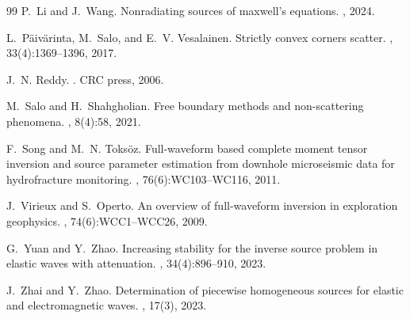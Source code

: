 \documentclass[11pt,reqno,oneside]{amsart}
\theoremstyle{definition}
\theoremstyle{remark}
\numberwithin{equation}{section}
\numberwithin{equation}{section}
\theoremstyle{remark}
\begin{document}
\begin{thebibliography}{99}
	P.~Li and J.~Wang.
	\newblock Nonradiating sources of maxwell's equations.
	, 2024.
	
	L.~P{\"a}iv{\"a}rinta, M.~Salo, and E.~V. Vesalainen.
	\newblock Strictly convex corners scatter.
	, 33(4):1369--1396, 2017.
	
	J.~N. Reddy.
	.
	\newblock CRC press, 2006.
	
	M.~Salo and H.~Shahgholian.
	\newblock Free boundary methods and non-scattering phenomena.
	, 8(4):58, 2021.
	
	F.~Song and M.~N. Toks{\"o}z.
	\newblock Full-waveform based complete moment tensor inversion and source
	parameter estimation from downhole microseismic data for hydrofracture
	monitoring.
	, 76(6):WC103--WC116, 2011.
	
	J.~Virieux and S.~Operto.
	\newblock An overview of full-waveform inversion in exploration geophysics.
	, 74(6):WCC1--WCC26, 2009.
	
	G.~Yuan and Y.~Zhao.
	\newblock Increasing stability for the inverse source problem in elastic waves
	with attenuation.
	, 34(4):896--910, 2023.
	
	J.~Zhai and Y.~Zhao.
	\newblock Determination of piecewise homogeneous sources for elastic and
	electromagnetic waves.
	, 17(3), 2023.
	
\end{thebibliography}
\end{document}
